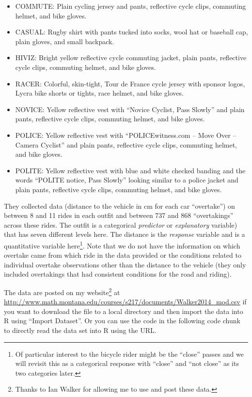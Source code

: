 \documentclass[
]{book}
\begin{document}
\begin{itemize}
\item
  COMMUTE: Plain cycling jersey and pants, reflective cycle clips, commuting helmet, and bike gloves.
\item
  CASUAL: Rugby shirt with pants tucked into socks, wool hat or baseball cap, plain gloves, and small backpack.
\item
  HIVIZ: Bright yellow reflective cycle commuting jacket, plain pants, reflective cycle clips, commuting helmet, and bike gloves.
\item
  RACER: Colorful, skin-tight, Tour de France cycle jersey with sponsor logos, Lycra bike shorts or tights, race helmet, and bike gloves.
\item
  NOVICE: Yellow reflective vest with ``Novice Cyclist, Pass Slowly'' and plain pants, reflective cycle clips, commuting helmet, and bike gloves.
\item
  POLICE: Yellow reflective vest with ``POLICEwitness.com -- Move Over -- Camera Cyclist'' and plain pants, reflective cycle clips, commuting helmet, and bike gloves.
\item
  POLITE: Yellow reflective vest with blue and white checked banding and the words ``POLITE notice, Pass Slowly'' looking similar to a police jacket and plain pants, reflective cycle clips, commuting helmet, and bike gloves.
\end{itemize}

They collected data (distance to the vehicle in cm for each car ``overtake'') on between 8 and 11 rides in each outfit and between 737 and 868 ``overtakings'' across these rides. The outfit is a categorical \emph{predictor} or \emph{explanatory} variable)  that has seven different levels here. The distance is the \emph{response} variable  and is a quantitative variable here\footnote{Of particular interest to the bicycle rider might be the ``close'' passes and we will revisit this as a categorical response with ``close'' and ``not close'' as its two categories later.}. Note that we do not have the information on which overtake came from which ride in the data provided or the conditions related to individual overtake observations other than the distance to the vehicle (they only included overtakings that had consistent conditions for the road and riding).

\indent The data are posted on my website\footnote{Thanks to Ian Walker for allowing me to use and post these data.} at \url{http://www.math.montana.edu/courses/s217/documents/Walker2014_mod.csv} if you want to download the file to a local directory and then import the data into R using ``Import Dataset''. Or you can use the code in the following code chunk to directly read the data set into R using the URL.
\end{document}
